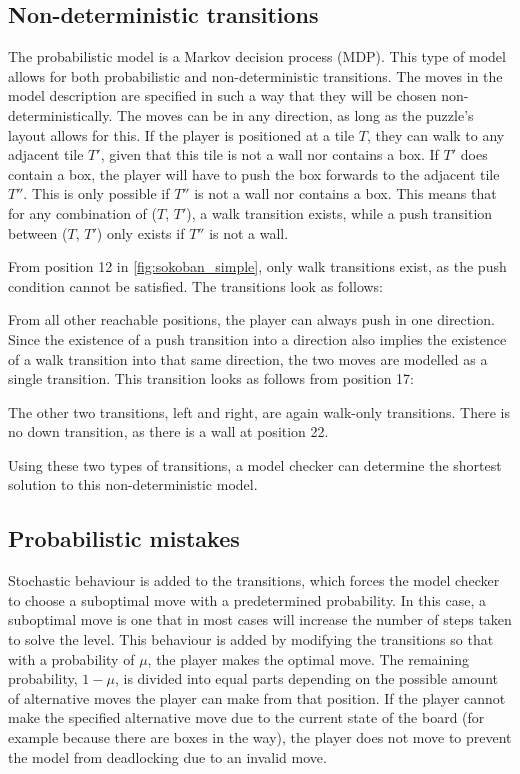 \subsection{Non-deterministic transitions}
The probabilistic model is a Markov decision process (MDP). This type of model allows for both probabilistic and non-deterministic transitions. The moves in the model description are specified in such a way that they will be chosen non-deterministically. The moves can be in any direction, as long as the puzzle's layout allows for this. If the player is positioned at a tile $T$, they can walk to any adjacent tile $T'$, given that this tile is not a wall nor contains a box. If $T'$ does contain a box, the player will have to push the box forwards to the adjacent tile $T''$. This is only possible if $T''$ is not a wall nor contains a box. This means that for any combination of ($T$, $T'$), a walk transition exists, while a push transition between ($T$, $T'$) only exists if $T''$ is not a wall.

From position 12 in \autoref{fig:sokoban_simple}, only walk transitions exist, as the push condition cannot be satisfied. The transitions look as follows:

From all other reachable positions, the player can always push in one direction. Since the existence of a push transition into a direction also implies the existence of a walk transition into that same direction, the two moves are modelled as a single transition. This transition looks as follows from position 17:

The other two transitions, left and right, are again walk-only transitions. There is no down transition, as there is a wall at position 22.

Using these two types of transitions, a model checker can determine the shortest solution to this non-deterministic model.

\subsection{Probabilistic mistakes} 
Stochastic behaviour is added to the transitions, which forces the model checker to choose a suboptimal move with a predetermined probability. In this case, a suboptimal move is one that in most cases will increase the number of steps taken to solve the level. This behaviour is added by modifying the transitions so that with a probability of $\mu$, the player makes the optimal move. The remaining probability, $1 - \mu$, is divided into equal parts depending on the possible amount of alternative moves the player can make from that position. If the player cannot make the specified alternative move due to the current state of the board (for example because there are boxes in the way), the player does not move to prevent the model from deadlocking due to an invalid move.

